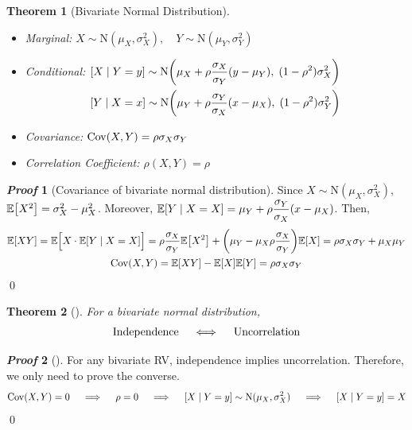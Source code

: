 \documentclass[10pt,UTF8]{article}
\newenvironment{definition box}
{\begin{tcolorbox}[colback=blue!5!white,colframe=blue!75!black,parbox=false,before upper=\par,before lower=\par]}
{\end{tcolorbox}}
\newenvironment{theorem box}
{\begin{tcolorbox}[colback=yellow!5!white,colframe=yellow!75!black,parbox=false,before upper=\par,before lower=\par]}
{\end{tcolorbox}}
\theoremstyle{definition}
\newtheorem{definition inner}{Definition}[section]
\theoremstyle{plain}
\newtheorem{theorem inner}{Theorem}[section]
\newenvironment{theorem}[1][]
{\begin{theorem box}\begin{theorem inner}[#1]\hfill\par}
{\end{theorem inner}\end{theorem box}}
\theoremstyle{definition}
\newtheorem*{proof inner}{\textit{Proof}}
\renewenvironment{proof}[1][]
{\begin{proof inner}[#1]\hfill\par}
{\qed\end{proof inner}}
\theoremstyle{remark}
\newcommand{\E}[1]{\mathbb{E}\qty[#1]}  %
\newcommand{\Cov}{\mathrm{Cov}\qty}  %
\begin{document}
\begin{theorem}[Bivariate Normal Distribution]
    \begin{itemize}
        \item Marginal:\quad
            $\displaystyle
            X\sim\mathrm{N}(\mu_X,\sigma_X^2),\quad
            Y\sim\mathrm{N}(\mu_Y,\sigma_Y^2)$
        \item Conditional:\quad
        $\begin{gathered}[t]
            [X\mid Y=y] \sim\mathrm{N}\qty(
                \mu_X + \rho\frac{\sigma_X}{\sigma_Y}(y-\mu_Y),\;
                (1-\rho^2)\sigma_X^2
            ) \\
            [Y\mid X=x] \sim\mathrm{N}\qty(
                \mu_Y + \rho\frac{\sigma_Y}{\sigma_X}(x-\mu_X),\;
                (1-\rho^2)\sigma_Y^2
            )
        \end{gathered}$
        \item Covariance:\quad
            $\Cov(X,Y) = \rho\sigma_X\sigma_Y$
        \item Correlation Coefficient:\quad
            $\rho(X,Y) = \rho$
    \end{itemize}
\end{theorem}

\begin{proof}[Covariance of bivariate normal distribution]
    Since $X\sim\mathrm{N}(\mu_X,\sigma_X^2)$, $\E{X^2}=\sigma_X^2-\mu_X^2$.
    Moreover, $\E{Y\mid X=X} = \mu_Y + \rho\dfrac{\sigma_Y}{\sigma_X}(x-\mu_X)$.
    Then,
    \begin{gather*}
        \E{X Y} = \E{X\cdot\E{Y\mid X=X}\vphantom{\Big|}}
        = \rho\frac{\sigma_X}{\sigma_Y}\E{X^2}
        + \qty(\mu_Y-\mu_X\rho\frac{\sigma_X}{\sigma_Y})\E{X}
        = \rho\sigma_X\sigma_Y + \mu_X\mu_Y \\
        \Cov(X,Y) = \E{X Y} - \E{X}\E{Y} = \rho\sigma_X\sigma_Y
    \end{gather*}
\end{proof}

\begin{theorem}
    For a bivariate normal distribution,
    \begin{equation*}
        \qq{Independence} \iff \qq{Uncorrelation}
    \end{equation*}
\end{theorem}
\begin{proof}
    For any bivariate RV,
    independence implies uncorrelation.
    Therefore, we only need to prove the converse.
    \begin{gather*}
        \Cov(X,Y) = 0 \quad\implies\quad \rho = 0 \quad\implies\quad
        [X\mid Y=y] \sim\mathrm{N}(\mu_X,\sigma_X^2)
        \quad\implies\quad [X\mid Y=y] = X
    \end{gather*}
\end{proof}
\end{document}

